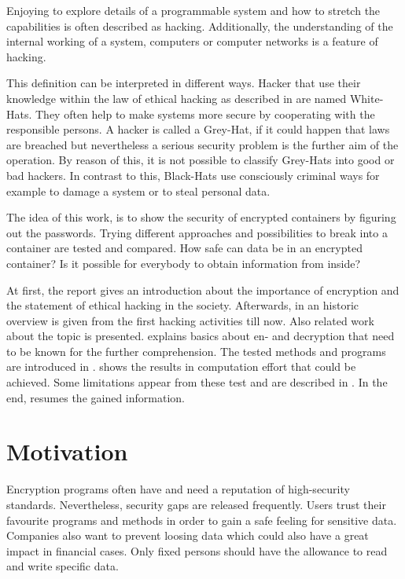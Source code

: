 
Enjoying to explore details of a programmable system and how to stretch the capabilities is often described as hacking. Additionally, the understanding of the internal working of a system, computers or computer networks is a feature of hacking. \cite{jargon}

This definition can be interpreted in different ways. Hacker that use their knowledge within the law of ethical hacking as described in  are named White-Hats. They often help to make systems more secure by cooperating with the responsible persons. A hacker is called a Grey-Hat, if it could happen that laws are breached but nevertheless a serious security problem is the further aim of the operation. By reason of this, it is not possible to classify Grey-Hats into good or bad hackers. In contrast to this, Black-Hats use consciously criminal ways for example to damage a system or to steal personal data.

The idea of this work, is to show the security of encrypted containers by figuring out the passwords. Trying different approaches and possibilities to break into a container are tested and compared. How safe can data be in an encrypted container? Is it possible for everybody to obtain information from inside?

At first, the report gives an introduction about the importance of encryption and the statement of ethical hacking in the society. Afterwards, in  an historic overview is given from the first hacking activities till now. Also related work about the topic is presented.  explains basics about en- and decryption that need to be known for the further comprehension. The tested methods and programs are introduced in .  shows the results in computation effort that could be achieved. Some limitations appear from these test and are described in . In the end,  resumes the gained information.

\section{Motivation}
\label{sec:motivation}

Encryption programs often have and need a reputation of high-security standards. Nevertheless, security gaps are released frequently. Users trust their favourite programs and methods in order to gain a safe feeling for sensitive data. Companies also want to prevent loosing data which could also have a great impact in financial cases. Only fixed persons should have the allowance to read and write specific data. 

